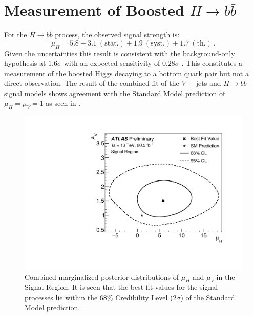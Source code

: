 \section{Measurement of Boosted $H \rightarrow b\bar{b}$} \label{sec:results:procedure}

For the $H \rightarrow b\bar{b}$ process, the observed signal strength is:
%
$$ \mu_{H} = 5.8 \pm 3.1~\mathrm{(stat.)} \pm 1.9~\mathrm{(syst.)} \pm 1.7~\mathrm{(th.)}\,. $$
%
Given the uncertainties this result is consistent with the background-only
hypothesis at $1.6\sigma$ with an expected sensitivity of $0.28\sigma$
\cite{Feickert:HiggsCouplings2018}.  This constitutes a measurement of the
boosted Higgs decaying to a bottom quark pair but not a direct observation. The
result of the combined fit of the $V$ + jets and $H \rightarrow b\bar{b}$
signal models shows agreement with the Standard Model prediction of $\mu_{H} =
\mu_{V} = 1$ as seen in .
%
\begin{figure}
\centering
\includegraphics[width=.6\linewidth]{figures/results/contour}
\caption{\cite{ATLAS-CONF-2018-052}
Combined marginalized posterior distributions of $\mu_{H}$ and $\mu_{V}$ in the
Signal Region.  It is seen that the best-fit values for the signal processes
lie within the 68\% Credibility Level ($2\sigma$) of the Standard Model
prediction.}
\label{sec:results:contour}
\end{figure}
